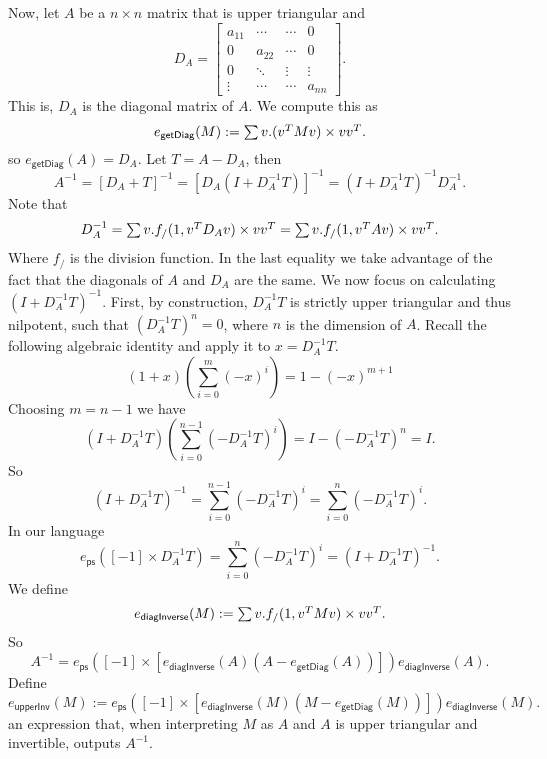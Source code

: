 Now, let $A$ be a $n\times n$ matrix that is upper triangular and
\[
D_A = \begin{bmatrix}
    a_{11} & \cdots & \cdots &  0 \\
    0 & a_{22} & \cdots &  0 \\
    0 & \ddots & \vdots & \vdots \\
    \vdots & \cdots& \cdots & a_{nn}
\end{bmatrix}.
\]
This is, $D_A$ is the diagonal matrix of $A$. We compute this as
$$
e_{\mathsf{getDiag}}(M) := \textstyle\sum v. (v^TMv) \times vv^T.
$$
so $e_{\mathsf{getDiag}}(A)=D_A$.
Let $T=A-D_A$, then
$$
A^{-1}=\left[ D_A+T \right]^{-1}= \left[ D_A\left( I+D_A^{-1}T\right) \right]^{-1} = \left( I+D_A^{-1}T\right)^{-1}D_A^{-1}.
$$
Note that
$$
D_A^{-1}=\textstyle\sum v. f_{/}(1,v^TD_Av)\times vv^T=\textstyle\sum v. f_{/}(1,v^TAv)\times vv^T.
$$
Where $f_{/}$ is the division function. In the last equality we take advantage of the fact that the diagonals of $A$ and $D_A$ are the same.
We now focus on calculating $\left( I+D_A^{-1}T\right)^{-1}$. First, by construction, $D_A^{-1}T$ is strictly upper triangular and thus nilpotent, 
such that $\left( D_A^{-1}T\right)^n=0$, where $n$ is the dimension of $A$.
Recall the following algebraic identity and apply it to $x=D_A^{-1}T$. $$(1+x)\left( \sum_{i=0}^{m}(-x)^i \right)=1-(-x)^{m+1}$$
Choosing $m=n-1$ we have
$$
\left(I+D_A^{-1}T \right)\left( \sum_{i=0}^{n-1}(-D_A^{-1}T)^i \right)=I- \left( -D_A^{-1}T\right)^n =I.
$$
So
$$
\left(I+D_A^{-1}T \right)^{-1}=\sum_{i=0}^{n-1}(-D_A^{-1}T)^i=\sum_{i=0}^{n}(-D_A^{-1}T)^i.
$$
In our language
$$
e_{\mathsf{ps}}([-1]\times D_A^{-1}T)=\sum_{i=0}^{n}(-D_A^{-1}T)^i=\left(I+D_A^{-1}T \right)^{-1}.
$$
We define
$$
e_{\mathsf{diagInverse}}(M):=\textstyle\sum v. f_{/}(1,v^TMv)\times vv^T.
$$
So
$$
A^{-1}= e_{\mathsf{ps}}\left([-1]\times \left[e_{\mathsf{diagInverse}}(A)(A-e_{\mathsf{getDiag}}(A))\right] \right)e_{\mathsf{diagInverse}}(A).
$$
Define
$$
e_{\mathsf{upperInv}}(M):= e_{\mathsf{ps}}\left([-1]\times \left[e_{\mathsf{diagInverse}}(M)(M-e_{\mathsf{getDiag}}(M))\right] \right)e_{\mathsf{diagInverse}}(M).
$$
an expression that, when interpreting $M$ as $A$ and $A$ is upper triangular and invertible, outputs $A^{-1}$.

